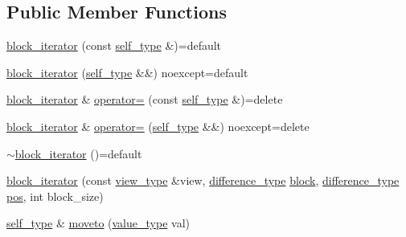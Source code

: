 \subsection*{Public Member Functions}
\begin{DoxyCompactItemize}
\item 
\mbox{\hyperlink{classirk_1_1index_1_1block__iterator_a00174f254405749a39d2009b2a6819bf}{block\+\_\+iterator}} (const \mbox{\hyperlink{classirk_1_1index_1_1block__iterator_a338ee8fee726492e9f8bbad4b4d75766}{self\+\_\+type}} \&)=default
\item 
\mbox{\hyperlink{classirk_1_1index_1_1block__iterator_ab166ce990eeb6efb45506acd57626042}{block\+\_\+iterator}} (\mbox{\hyperlink{classirk_1_1index_1_1block__iterator_a338ee8fee726492e9f8bbad4b4d75766}{self\+\_\+type}} \&\&) noexcept=default
\item 
\mbox{\hyperlink{classirk_1_1index_1_1block__iterator}{block\+\_\+iterator}} \& \mbox{\hyperlink{classirk_1_1index_1_1block__iterator_afc88fc6cd2cd2a148b821e5e89b6649a}{operator=}} (const \mbox{\hyperlink{classirk_1_1index_1_1block__iterator_a338ee8fee726492e9f8bbad4b4d75766}{self\+\_\+type}} \&)=delete
\item 
\mbox{\hyperlink{classirk_1_1index_1_1block__iterator}{block\+\_\+iterator}} \& \mbox{\hyperlink{classirk_1_1index_1_1block__iterator_a6696d285fe4899cb9aec7ac50fb09ad6}{operator=}} (\mbox{\hyperlink{classirk_1_1index_1_1block__iterator_a338ee8fee726492e9f8bbad4b4d75766}{self\+\_\+type}} \&\&) noexcept=delete
\item 
\mbox{\hyperlink{classirk_1_1index_1_1block__iterator_a6fd6578325dd4bcc585accac5782bf74}{$\sim$block\+\_\+iterator}} ()=default
\item 
\mbox{\hyperlink{classirk_1_1index_1_1block__iterator_ad68e07c02a8233cb098a23d57abf0e01}{block\+\_\+iterator}} (const \mbox{\hyperlink{classirk_1_1index_1_1block__iterator_a75bc89b691db97f719af7284ee91afa0}{view\+\_\+type}} \&view, \mbox{\hyperlink{classirk_1_1index_1_1block__iterator_abb90b6c7a6100113770359e6eb9dd8cf}{difference\+\_\+type}} \mbox{\hyperlink{classirk_1_1index_1_1block__iterator_afc0c06615fcd46d243bccd2a6a77ffeb}{block}}, \mbox{\hyperlink{classirk_1_1index_1_1block__iterator_abb90b6c7a6100113770359e6eb9dd8cf}{difference\+\_\+type}} \mbox{\hyperlink{classirk_1_1index_1_1block__iterator_a145b1a3e5f50d3eb0fc1135cda5f1253}{pos}}, int block\+\_\+size)
\item 
\mbox{\hyperlink{classirk_1_1index_1_1block__iterator_a338ee8fee726492e9f8bbad4b4d75766}{self\+\_\+type}} \& \mbox{\hyperlink{classirk_1_1index_1_1block__iterator_a7fd567ed2c5ece1ad02cf21957396c88}{moveto}} (\mbox{\hyperlink{classirk_1_1index_1_1block__iterator_a4d6c5b58cedd871e8a8f235e425e8587}{value\+\_\+type}} val)

\end{DoxyCompactItemize}
